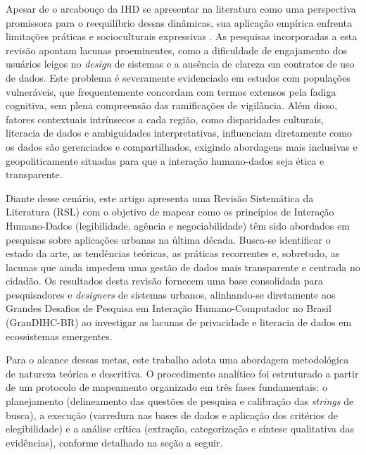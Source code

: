 \documentclass[12pt]{article}
\begin{document}
    Apesar de o arcabouço da IHD se apresentar na literatura como uma perspectiva promissora para o reequilíbrio dessas dinâmicas, sua aplicação empírica enfrenta limitações práticas e socioculturais expressivas \cite{Victorelli2020Human}. As pesquisas incorporadas a esta revisão apontam lacunas proeminentes, como a dificuldade de engajamento dos usuários leigos no \textit{design} de sistemas e a ausência de clareza em contratos de uso de dados. Este problema é severamente evidenciado em estudos com populações vulneráveis, que frequentemente concordam com termos extensos pela fadiga cognitiva, sem plena compreensão das ramificações de vigilância. Além disso, fatores contextuais intrínsecos a cada região, como disparidades culturais, literacia de dados e ambiguidades interpretativas, influenciam diretamente como os dados são gerenciados e compartilhados, exigindo abordagens mais inclusivas e geopoliticamente situadas para que a interação humano-dados seja ética e transparente.

    Diante desse cenário, este artigo apresenta uma Revisão Sistemática da Literatura (RSL) com o objetivo de mapear como os princípios de Interação Humano-Dados (legibilidade, agência e negociabilidade) têm sido abordados em pesquisas sobre aplicações urbanas na última década. Busca-se identificar o estado da arte, as tendências teóricas, as práticas recorrentes e, sobretudo, as lacunas que ainda impedem uma gestão de dados mais transparente e centrada no cidadão. Os resultados desta revisão fornecem uma base consolidada para pesquisadores e \textit{designers} de sistemas urbanos, alinhando-se diretamente aos Grandes Desafios de Pesquisa em Interação Humano-Computador no Brasil (GranDIHC-BR) ao investigar as lacunas de privacidade e literacia de dados em ecossistemas emergentes.

    Para o alcance dessas metas, este trabalho adota uma abordagem metodológica de natureza teórica e descritiva. O procedimento analítico foi estruturado a partir de um protocolo de mapeamento organizado em três fases fundamentais: o planejamento (delineamento das questões de pesquisa e calibração das \textit{strings} de busca), a execução (varredura nas bases de dados e aplicação dos critérios de elegibilidade) e a análise crítica (extração, categorização e síntese qualitativa das evidências), conforme detalhado na seção a seguir.
    
\end{document}
